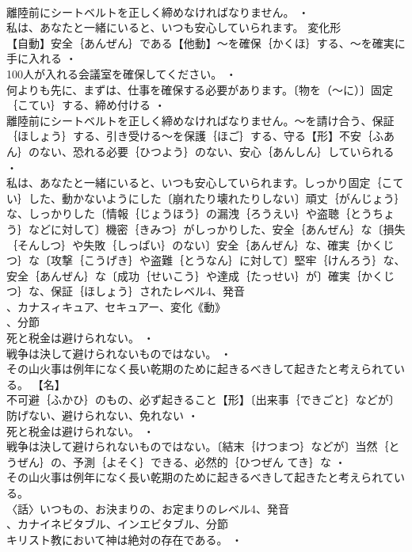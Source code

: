 \documentclass[8pt]{extreport}
\begin{document}
\begin{CJK}{UTF8}{min}
\\	離陸前にシートベルトを正しく締めなければなりません。 ・
\\	私は、あなたと一緒にいると、いつも安心していられます。	変化形 
\\	【自動】安全｛あんぜん｝である【他動】～を確保｛かくほ｝する、～を確実に手に入れる ・
\\	100人が入れる会議室を確保してください。 ・
\\	何よりも先に、まずは、仕事を確保する必要があります。〔物を（～に）〕固定｛こてい｝する、締め付ける ・
\\	離陸前にシートベルトを正しく締めなければなりません。～を請け合う、保証｛ほしょう｝する、引き受ける～を保護｛ほご｝する、守る【形】不安｛ふあん｝のない、恐れる必要｛ひつよう｝のない、安心｛あんしん｝していられる ・
\\	私は、あなたと一緒にいると、いつも安心していられます。しっかり固定｛こてい｝した、動かないようにした〔崩れたり壊れたりしない〕頑丈｛がんじょう｝な、しっかりした〔情報｛じょうほう｝の漏洩｛ろうえい｝や盗聴｛とうちょう｝などに対して〕機密｛きみつ｝がしっかりした、安全｛あんぜん｝な〔損失｛そんしつ｝や失敗｛しっぱい｝のない〕安全｛あんぜん｝な、確実｛かくじつ｝な〔攻撃｛こうげき｝や盗難｛とうなん｝に対して〕堅牢｛けんろう｝な、安全｛あんぜん｝な〔成功｛せいこう｝や達成｛たっせい｝が〕確実｛かくじつ｝な、保証｛ほしょう｝されたレベル4、発音
\\	、カナスィキュア、セキュアー、変化《動》
\\	、分節
\\	死と税金は避けられない。 ・
\\	戦争は決して避けられないものではない。 ・
\\	その山火事は例年になく長い乾期のために起きるべきして起きたと考えられている。		【名】
\\	不可避｛ふかひ｝のもの、必ず起きること【形】〔出来事｛できごと｝などが〕防げない、避けられない、免れない ・
\\	死と税金は避けられない。 ・
\\	戦争は決して避けられないものではない。〔結末｛けつまつ｝などが〕当然｛とうぜん｝の、予測｛よそく｝できる、必然的｛ひつぜん てき｝な ・
\\	その山火事は例年になく長い乾期のために起きるべきして起きたと考えられている。
\\	〈話〉いつもの、お決まりの、お定まりのレベル4、発音
\\	、カナイネビタブル、インエビタブル、分節
\\	キリスト教において神は絶対の存在である。 ・

\end{CJK}
\end{document}
